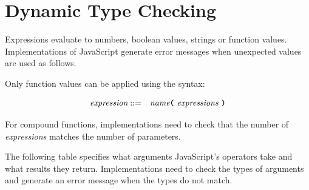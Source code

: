 
\section{Dynamic Type Checking}

Expressions evaluate to numbers, boolean values, strings or function values. Implementations
of JavaScript generate error messages when unexpected values are used as follows.

Only function values can be applied using the syntax:

\begin{eqnarray*}
 \textit{expression}    
                                   & ::=   &  \textit{name}
                                               \texttt{\textbf{(}}\  \textit{expressions} \
                                               \texttt{\textbf{)}}\\ 
\end{eqnarray*}

For compound functions, implementations need to check that the number of \textit{expressions}
matches the number of parameters.

The following table specifies what arguments JavaScript's operators
take and what results they return. Implementations need to check the types of arguments and
generate an error message when the types do not match.

